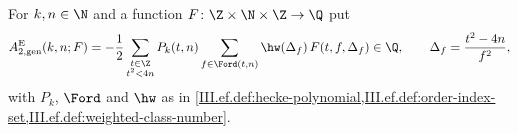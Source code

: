 For $k,n\in\N$ and a function $F\colon\Z\times\N\times\Z\to\Q$ put
\[
  A_{2,\mathrm{gen}}^{\mathrm E}(k,n;F)=-\frac12\sum_{\substack{t\in\Z\\ t^2<4n}}P_k(t,n)\sum_{f\in\Ford(t,n)}\hw(\Delta_f)\,F(t,f,\Delta_f)\in\Q,\qquad
  \Delta_f=\frac{t^2-4n}{f^2},
\]
with $P_k$, $\Ford$ and $\hw$ as in \cref{III.ef.def:hecke-polynomial,III.ef.def:order-index-set,III.ef.def:weighted-class-number}.

